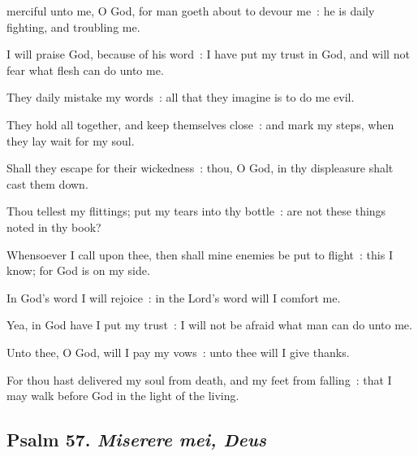  merciful unto me, O God, for man goeth about to devour me~: he is daily fighting, and troubling me.\par
{}
I will praise God, because of his word~: I have put my trust in God, and will not fear what flesh can do unto me.\par
{}They daily mistake my words~: all that they imagine is to do me evil.\par
{}They hold all together, and keep themselves close~: and mark my steps, when they lay wait for my soul.\par
{}Shall they escape for their wickedness~: thou, O God, in thy displeasure shalt cast them down.\par
{}Thou tellest my flittings; put my tears into thy bottle~: are not these things noted in thy book?\par
{}Whensoever I call upon thee, then shall mine enemies be put to flight~: this I know; for God is on my side.\par
{}In God's word I will rejoice~: in the Lord's word will I comfort me.\par
{}Yea, in God have I put my trust~: I will not be afraid what man can do unto me.\par
{}Unto thee, O God, will I pay my vows~: unto thee will I give thanks.\par
{}For thou hast delivered my soul from death, and my feet from falling~: that I may walk before God in the light of the living.\par

\subsection{Psalm 57. \textit{Miserere mei, Deus}}


